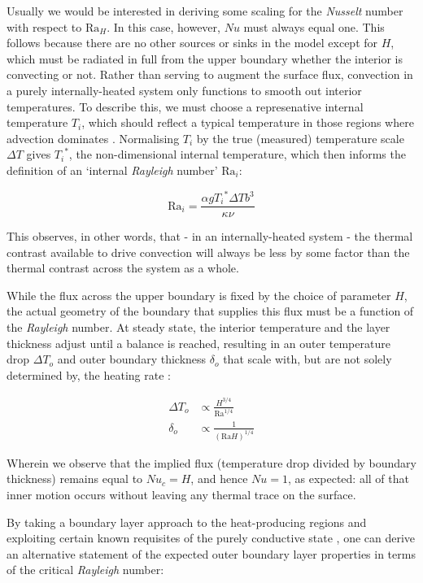 Usually we would be interested in deriving some scaling for the \textit{Nusselt} number with respect to ${\mathrm{Ra}}_H$. In this case, however, $Nu$ must always equal one. This follows because there are no other sources or sinks in the model except for $H$, which must be radiated in full from the upper boundary whether the interior is convecting or not. Rather than serving to augment the surface flux, convection in a purely internally-heated system only functions to smooth out interior temperatures. To describe this, we must choose a represenative internal temperature $T_{i}$, which should reflect a typical temperature in those regions where advection dominates \cite{Solomatov2000-xn}. Normalising $T_{i}$ by the true (measured) temperature scale $\Delta T$ gives ${T_{i}}^{*}$, the non-dimensional internal temperature, which then informs the definition of an `internal \textit{Rayleigh} number' ${\mathrm{Ra}}_i$:

\begin{equation}
{\mathrm{Ra}}_i = \frac{\alpha g {T_i}^{*} \Delta T b^3}{\kappa \nu}
\end{equation}

This observes, in other words, that - in an internally-heated system - the thermal contrast available to drive convection will always be less by some factor than the thermal contrast across the system as a whole.

While the flux across the upper boundary is fixed by the choice of parameter $H$, the actual geometry of the boundary that supplies this flux must be a function of the \textit{Rayleigh} number. At steady state, the interior temperature and the layer thickness adjust until a balance is reached, resulting in an outer temperature drop ${\Delta T}_o$ and outer boundary thickness ${\delta}_o$ that scale with, but are not solely determined by, the heating rate \cite{Schubert2001-ea}:

\begin{align*}
{\Delta T}_o &\propto \frac{H^{3/4}}{{\mathrm{Ra}}^{1/4}} \\
{\delta}_o &\propto \frac{1}{{(\mathrm{Ra}H)}^{1/4}}
\end{align*}

Wherein we observe that the implied flux (temperature drop divided by boundary thickness) remains equal to ${Nu}_c = H$, and hence $Nu=1$, as expected: all of that inner motion occurs without leaving any thermal trace on the surface.

By taking a boundary layer approach to the heat-producing regions \cite{Jaupart2010-zy} and exploiting certain known requisites of the purely conductive state \cite{Vilella2017-mg}, one can derive an alternative statement of the expected outer boundary layer properties in terms of the critical \textit{Rayleigh} number:

